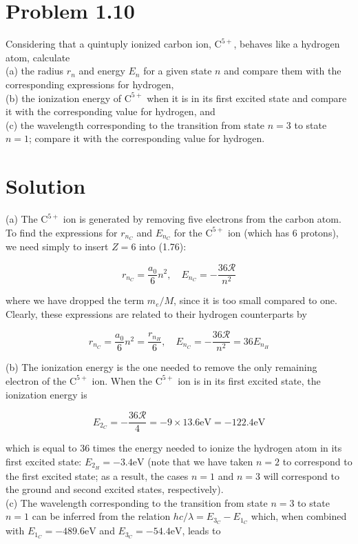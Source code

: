 \documentclass[10pt]{article}
\begin{document}
\section*{Problem 1.10}
Considering that a quintuply ionized carbon ion, $\mathrm{C}^{5+}$, behaves like a hydrogen atom, calculate\\
(a) the radius $r_{n}$ and energy $E_{n}$ for a given state $n$ and compare them with the corresponding expressions for hydrogen,\\
(b) the ionization energy of $\mathrm{C}^{5+}$ when it is in its first excited state and compare it with the corresponding value for hydrogen, and\\
(c) the wavelength corresponding to the transition from state $n=3$ to state $n=1$; compare it with the corresponding value for hydrogen.

\section*{Solution}
(a) The $\mathrm{C}^{5+}$ ion is generated by removing five electrons from the carbon atom. To find the expressions for $r_{n_{C}}$ and $E_{n_{C}}$ for the $\mathrm{C}^{5+}$ ion (which has 6 protons), we need simply to insert $Z=6$ into (1.76):


\begin{equation*}
r_{n_{C}}=\frac{a_{0}}{6} n^{2}, \quad E_{n_{C}}=-\frac{36 \mathcal{R}}{n^{2}} \tag{1.193}
\end{equation*}


where we have dropped the term $m_{e} / M$, since it is too small compared to one. Clearly, these expressions are related to their hydrogen counterparts by


\begin{equation*}
r_{n_{C}}=\frac{a_{0}}{6} n^{2}=\frac{r_{n_{H}}}{6}, \quad E_{n_{C}}=-\frac{36 \mathcal{R}}{n^{2}}=36 E_{n_{H}} \tag{1.194}
\end{equation*}


(b) The ionization energy is the one needed to remove the only remaining electron of the $\mathrm{C}^{5+}$ ion. When the $\mathrm{C}^{5+}$ ion is in its first excited state, the ionization energy is


\begin{equation*}
E_{2_{C}}=-\frac{36 \mathcal{R}}{4}=-9 \times 13.6 \mathrm{eV}=-122.4 \mathrm{eV} \tag{1.195}
\end{equation*}


which is equal to 36 times the energy needed to ionize the hydrogen atom in its first excited state: $E_{2_{H}}=-3.4 \mathrm{eV}$ (note that we have taken $n=2$ to correspond to the first excited state; as a result, the cases $n=1$ and $n=3$ will correspond to the ground and second excited states, respectively).\\
(c) The wavelength corresponding to the transition from state $n=3$ to state $n=1$ can be inferred from the relation $h c / \lambda=E_{3_{C}}-E_{1_{C}}$ which, when combined with $E_{1_{C}}=-489.6 \mathrm{eV}$ and $E_{3_{C}}=-54.4 \mathrm{eV}$, leads to
\end{document}
